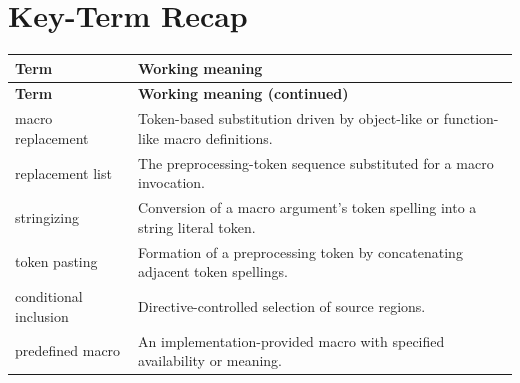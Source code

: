 \documentclass[11pt,letterpaper]{article}
\begin{document}
\section{Key-Term Recap}
\begin{longtable}{@{}>{\RaggedRight\arraybackslash}p{}>{\RaggedRight\arraybackslash}p{}@{}}\toprule\textbf{Term} & \textbf{Working meaning}\\\midrule\endfirsthead\toprule\textbf{Term} & \textbf{Working meaning (continued)}\\\midrule\endhead\bottomrule\endfoot
macro replacement & Token-based substitution driven by object-like or function-like macro definitions.\\
replacement list & The preprocessing-token sequence substituted for a macro invocation.\\
stringizing & Conversion of a macro argument's token spelling into a string literal token.\\
token pasting & Formation of a preprocessing token by concatenating adjacent token spellings.\\
conditional inclusion & Directive-controlled selection of source regions.\\
predefined macro & An implementation-provided macro with specified availability or meaning.\\
\end{longtable}
\end{document}
